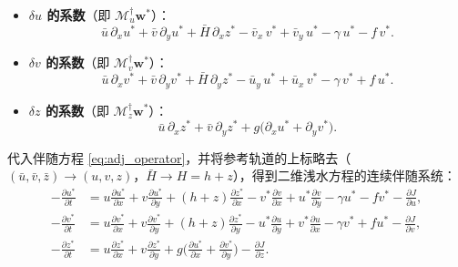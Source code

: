 \documentclass[12pt,a4paper,twoside]{article}
\begin{document}
\begin{itemize}
    \item \textbf{$\delta u$ 的系数}（即 $\mathcal{M}^\dagger_u\mathbf{w}^*$）：
    \begin{equation*}
        \bar u\,\partial_x u^* + \bar v\,\partial_y u^*
        + \bar H\,\partial_x z^*
        - \bar v_x\,v^* + \bar v_y\,u^*
        - \gamma\,u^* - f\,v^*.
    \end{equation*}
    \item \textbf{$\delta v$ 的系数}（即 $\mathcal{M}^\dagger_v\mathbf{w}^*$）：
    \begin{equation*}
        \bar u\,\partial_x v^* + \bar v\,\partial_y v^*
        + \bar H\,\partial_y z^*
        - \bar u_y\,u^* + \bar u_x\,v^*
        - \gamma\,v^* + f\,u^*.
    \end{equation*}
    \item \textbf{$\delta z$ 的系数}（即 $\mathcal{M}^\dagger_z\mathbf{w}^*$）：
    \begin{equation*}
        \bar u\,\partial_x z^* + \bar v\,\partial_y z^*
        + g\big(\partial_x u^* + \partial_y v^*\big).
    \end{equation*}
\end{itemize}

代入伴随方程 \eqref{eq:adj_operator}，并将参考轨道的上标略去（$(\bar u,\bar v,\bar z) \to (u,v,z)$，$\bar H \to H = h+z$），得到二维浅水方程的连续伴随系统：
\begin{align}
    -\frac{\partial u^*}{\partial t}
    &= u\frac{\partial u^*}{\partial x}
     + v\frac{\partial u^*}{\partial y}
     + (h+z)\frac{\partial z^*}{\partial x}
     - v^*\frac{\partial v}{\partial x}
     + u^*\frac{\partial v}{\partial y}
     - \gamma u^* - f v^*
     - \frac{\partial J}{\partial u}, \label{eq:adj_u_final} \\[4pt]
    -\frac{\partial v^*}{\partial t}
    &= u\frac{\partial v^*}{\partial x}
     + v\frac{\partial v^*}{\partial y}
     + (h+z)\frac{\partial z^*}{\partial y}
     - u^*\frac{\partial u}{\partial y}
     + v^*\frac{\partial u}{\partial x}
     - \gamma v^* + f u^*
     - \frac{\partial J}{\partial v}, \label{eq:adj_v_final} \\[4pt]
    -\frac{\partial z^*}{\partial t}
    &= u\frac{\partial z^*}{\partial x}
     + v\frac{\partial z^*}{\partial y}
     + g\Big(\frac{\partial u^*}{\partial x} + \frac{\partial v^*}{\partial y}\Big)
     - \frac{\partial J}{\partial z}. \label{eq:adj_z_final}
\end{align}
\end{document}
